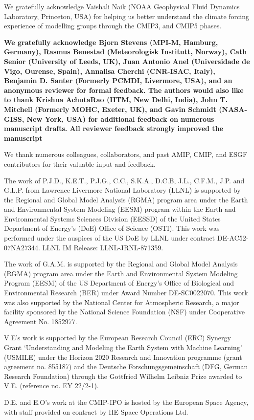 \documentclass[manuscript]{copernicus}
\def\cred#1{{\color{red}#1}}
\begin{document}
\begin{acknowledgements}
We gratefully acknowledge Vaishali Naik (NOAA Geophysical Fluid Dynamics Laboratory, Princeton, USA) for helping us better understand the climate forcing experience of modelling groups through the CMIP3, and CMIP5 phases.

\cred{\textbf{We gratefully acknowledge Bjorn Stevens (MPI-M, Hamburg, Germany), Rasmus Benestad (Meteorologisk Institutt, Norway), Cath Senior (University of Leeds, UK), Juan Antonio Anel (Universidade de Vigo, Ourense, Spain), Annalisa Cherchi (CNR-ISAC, Italy), Benjamin D. Santer (Formerly PCMDI, Livermore, USA), and an anonymous reviewer for formal feedback. The authors would also like to thank Krishna AchutaRao (IITM, New Delhi, India), John T. Mitchell (Formerly MOHC, Exeter, UK), and Gavin Schmidt (NASA-GISS, New York, USA) for additional feedback on numerous manuscript drafts. All reviewer feedback strongly improved the manuscript}}

We thank numerous colleagues, collaborators, and past AMIP, CMIP, and ESGF contributors for their valuable input and feedback.

The work of P.J.D., K.E.T., P.J.G., C.C., S.K.A., D.C.B, J.L., C.F.M., J.P. and G.L.P. from Lawrence Livermore National Laboratory (LLNL) is supported by the Regional and Global Model Analysis (RGMA) program area under the Earth and Environmental System Modeling (EESM) program within the Earth and Environmental Systems Sciences Division (EESSD) of the United States Department of Energy’s (DoE) Office of Science (OSTI). This work was performed under the auspices of the US DoE by LLNL under contract DE-AC52-07NA27344. LLNL IM Release: LLNL-JRNL-871359.

The work of G.A.M. is supported by the Regional and Global Model Analysis (RGMA) program area under the Earth and Environmental System Modeling Program (EESM) of the US Department of Energy's Office of Biological and Environmental Research (BER) under Award Number DE-SC0022070. This work was also supported by the National Center for Atmospheric Research, a major facility sponsored by the National Science Foundation (NSF) under Cooperative Agreement No. 1852977.

V.E’s work is supported by the European Research Council (ERC) Synergy Grant ‘Understanding and Modeling the Earth System with Machine Learning’ (USMILE) under the Horizon 2020 Research and Innovation programme (grant agreement no. 855187) and the Deutsche Forschungsgemeinschaft (DFG, German Research Foundation) through the Gottfried Wilhelm Leibniz Prize awarded to V.E. (reference no. EY 22/2-1).

D.E. and E.O's work at the CMIP-IPO is hosted by the European Space Agency, with staff provided on contract by HE Space Operations Ltd.


\end{acknowledgements}
\end{document}
